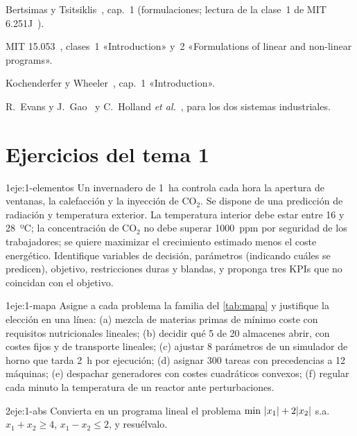 \begin{lecturas}
\item Bertsimas y Tsitsiklis~\cite{bt}, cap.~1 (formulaciones; lectura de la clase~1 de MIT 6.251J~\cite{mit6251}).
\item MIT 15.053~\cite{mit15053}, clases~1 «Introduction» y~2 «Formulations of linear and non-linear programs».
\item Kochenderfer y Wheeler~\cite{kw}, cap.~1 «Introduction».
\item R.~Evans y J.~Gao~\cite{deepmind} y C.~Holland \emph{et al.}~\cite{orion}, para los dos sistemas industriales.
\end{lecturas}

\section*{Ejercicios del tema 1}

\begin{ejercicio}{1}{eje:1-elementos}
Un invernadero de 1~ha controla cada hora la apertura de ventanas, la calefacción y la inyección de CO$_2$. Se dispone de una predicción de radiación y temperatura exterior. La temperatura interior debe estar entre 16 y 28~ºC; la concentración de CO$_2$ no debe superar 1000~ppm por seguridad de los trabajadores; se quiere maximizar el crecimiento estimado menos el coste energético. Identifique variables de decisión, parámetros (indicando cuáles se predicen), objetivo, restricciones duras y blandas, y proponga tres KPIs que no coincidan con el objetivo.
\end{ejercicio}

\begin{ejercicio}{1}{eje:1-mapa}
Asigne a cada problema la familia del \cref{tab:mapa} y justifique la elección en una línea: (a) mezcla de materias primas de mínimo coste con requisitos nutricionales lineales; (b) decidir qué 5 de 20 almacenes abrir, con costes fijos y de transporte lineales; (c) ajustar 8 parámetros de un simulador de horno que tarda 2~h por ejecución; (d) asignar 300 tareas con precedencias a 12 máquinas; (e) despachar generadores con costes cuadráticos convexos; (f) regular cada minuto la temperatura de un reactor ante perturbaciones.
\end{ejercicio}

\begin{ejercicio}{2}{eje:1-abs}
Convierta en un programa lineal el problema $\min\ \abs{x_1}+2\abs{x_2}$ s.a. $x_1+x_2\ge 4$, $x_1-x_2\le 2$, y resuélvalo.
\end{ejercicio}

